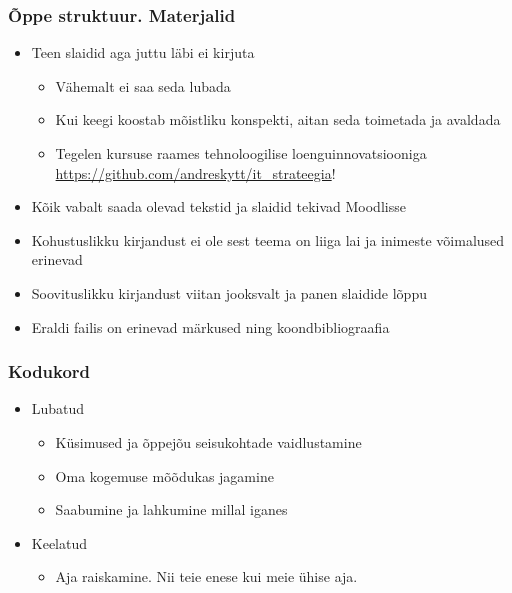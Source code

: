 \begin{frame}[fragile]
  \frametitle{Õppe struktuur. Materjalid}
	\begin{itemize}
		\item Teen slaidid aga juttu läbi ei kirjuta
		\begin{itemize}
			\item Vähemalt ei saa seda lubada
			\item Kui keegi koostab mõistliku konspekti, aitan seda toimetada ja avaldada
			\item Tegelen kursuse raames tehnoloogilise loenguinnovatsiooniga \url{https://github.com/andreskytt/it_strateegia}!
		\end{itemize}
		\item Kõik vabalt saada olevad tekstid ja slaidid tekivad Moodlisse
		\item Kohustuslikku kirjandust ei ole sest teema on liiga lai ja inimeste võimalused erinevad
		\item Soovituslikku kirjandust viitan jooksvalt ja panen slaidide lõppu 
		\item Eraldi failis on erinevad märkused ning koondbibliograafia
	\end{itemize}
\end{frame}


\begin{frame}[fragile]
  \frametitle{Kodukord}
	\begin{itemize}
		\item Lubatud
		\begin{itemize}
			\item Küsimused ja õppejõu seisukohtade vaidlustamine
			\item Oma kogemuse mõõdukas jagamine
			\item Saabumine ja lahkumine millal iganes
		\end{itemize}
		\item Keelatud
		\begin{itemize}
			\item Aja raiskamine. Nii teie enese kui meie ühise aja.
		\end{itemize}
	\end{itemize}
\end{frame}

